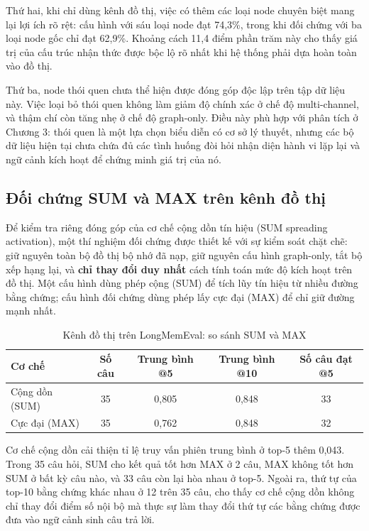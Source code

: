 \documentclass[../main.tex]{subfiles}
\begin{document}
Thứ hai, khi chỉ dùng kênh đồ thị, việc có thêm các loại node chuyên biệt mang lại lợi ích rõ rệt: cấu hình với sáu loại node đạt 74,3\%, trong khi đối chứng với ba loại node gốc chỉ đạt 62,9\%. Khoảng cách 11,4 điểm phần trăm này cho thấy giá trị của cấu trúc nhận thức được bộc lộ rõ nhất khi hệ thống phải dựa hoàn toàn vào đồ thị.

Thứ ba, node thói quen chưa thể hiện được đóng góp độc lập trên tập dữ liệu này. Việc loại bỏ thói quen không làm giảm độ chính xác ở chế độ multi-channel, và thậm chí còn tăng nhẹ ở chế độ graph-only. Điều này phù hợp với phân tích ở Chương 3: thói quen là một lựa chọn biểu diễn có cơ sở lý thuyết, nhưng các bộ dữ liệu hiện tại chưa chứa đủ các tình huống đòi hỏi nhận diện hành vi lặp lại và ngữ cảnh kích hoạt để chứng minh giá trị của nó.

\subsection{Đối chứng SUM và MAX trên kênh đồ thị}

Để kiểm tra riêng đóng góp của cơ chế cộng dồn tín hiệu (SUM spreading activation), một thí nghiệm đối chứng được thiết kế với sự kiểm soát chặt chẽ: giữ nguyên toàn bộ đồ thị bộ nhớ đã nạp, giữ nguyên cấu hình graph-only, tắt bộ xếp hạng lại, và \textbf{chỉ thay đổi duy nhất} cách tính toán mức độ kích hoạt trên đồ thị. Một cấu hình dùng phép cộng (SUM) để tích lũy tín hiệu từ nhiều đường bằng chứng; cấu hình đối chứng dùng phép lấy cực đại (MAX) để chỉ giữ đường mạnh nhất.

\begin{table}[H]
\centering
\caption{Kênh đồ thị trên LongMemEval: so sánh SUM và MAX}
\label{tab:sum_vs_max_graph_only}
\small
\begin{tabular}{@{}lcccc@{}}
\toprule
\textbf{Cơ chế} & \textbf{Số câu} & \textbf{Trung bình @5} & \textbf{Trung bình @10} & \textbf{Số câu đạt @5} \\
\midrule
Cộng dồn (SUM) & 35 & 0,805 & 0,848 & 33 \\
Cực đại (MAX) & 35 & 0,762 & 0,848 & 32 \\
\bottomrule
\end{tabular}
\end{table}

Cơ chế cộng dồn cải thiện tỉ lệ truy vấn phiên trung bình ở top-5 thêm 0,043. Trong 35 câu hỏi, SUM cho kết quả tốt hơn MAX ở 2 câu, MAX không tốt hơn SUM ở bất kỳ câu nào, và 33 câu còn lại hòa nhau ở top-5. Ngoài ra, thứ tự của top-10 bằng chứng khác nhau ở 12 trên 35 câu, cho thấy cơ chế cộng dồn không chỉ thay đổi điểm số nội bộ mà thực sự làm thay đổi thứ tự các bằng chứng được đưa vào ngữ cảnh sinh câu trả lời.
\end{document}
